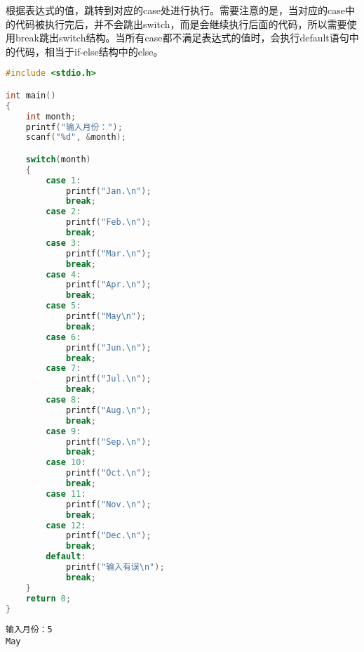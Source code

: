根据表达式的值，跳转到对应的case处进行执行。需要注意的是，当对应的case中的代码被执行完后，并不会跳出switch，而是会继续执行后面的代码，所以需要使用break跳出switch结构。当所有case都不满足表达式的值时，会执行default语句中的代码，相当于if-else结构中的else。\\


\begin{lstlisting}[language=C]
#include <stdio.h>

int main()
{
	int month;
	printf("输入月份：");
	scanf("%d", &month);

	switch(month)
	{
		case 1:
			printf("Jan.\n");
			break;
		case 2:
			printf("Feb.\n");
			break;
		case 3:
			printf("Mar.\n");
			break;
		case 4:
			printf("Apr.\n");
			break;
		case 5:
			printf("May\n");
			break;
		case 6:
			printf("Jun.\n");
			break;
		case 7:
			printf("Jul.\n");
			break;
		case 8:
			printf("Aug.\n");
			break;
		case 9:
			printf("Sep.\n");
			break;
		case 10:
			printf("Oct.\n");
			break;
		case 11:
			printf("Nov.\n");
			break;
		case 12:
			printf("Dec.\n");
			break;
		default:
			printf("输入有误\n");
			break;
	}
	return 0;
}
\end{lstlisting}

\begin{tcolorbox}
	\begin{verbatim}
输入月份：5
May
	\end{verbatim}
\end{tcolorbox}

\newpage